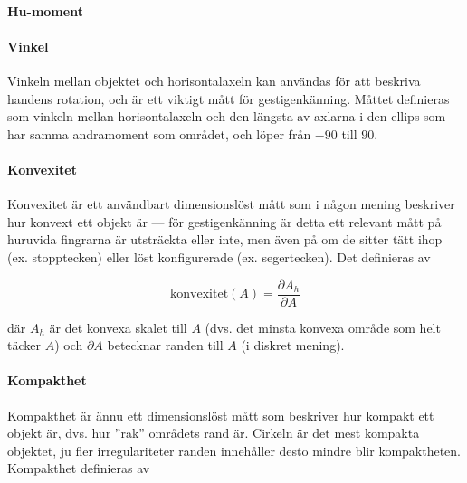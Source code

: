 \documentclass[../rapport_MVEX01-11-05]{subfiles}
\begin{document}
\paragraph{Hu-moment}


\paragraph{Vinkel}
\label{feat:vinkel}

Vinkeln mellan objektet och horisontalaxeln kan användas för att
beskriva handens rotation, och är ett viktigt mått för
gestigenkänning. Måttet definieras som vinkeln mellan horisontalaxeln
och den längsta av axlarna i den ellips som har samma andramoment som
området, och löper från $-90$\textdegree{} till $90$\textdegree{}.




\paragraph{Konvexitet}

Konvexitet \cite[s.~26]{Rudemo09} är ett användbart dimensionslöst
mått som i någon mening beskriver hur konvext ett objekt är --- för
gestigenkänning är detta ett relevant mått på huruvida fingrarna är
utsträckta eller inte, men även på om de sitter tätt ihop (ex.
stopptecken) eller löst konfigurerade (ex. segertecken). Det
definieras av

\begin{equation*}
  \textrm{konvexitet}(A) = \frac{\partial A_h}{\partial A}
\end{equation*}

där $A_h$ är det konvexa skalet till $A$ (dvs. det minsta konvexa område som
helt täcker $A$) och $\partial A$ betecknar randen till $A$ (i diskret
mening).

\paragraph{Kompakthet}

Kompakthet \cite[s.~26]{Rudemo09} är ännu ett dimensionslöst mått som
beskriver hur kompakt ett objekt är, dvs. hur ''rak'' områdets rand
är. Cirkeln är det mest kompakta objektet, ju fler irregulariteter
randen innehåller desto mindre blir kompaktheten. Kompakthet
definieras av
\end{document}
